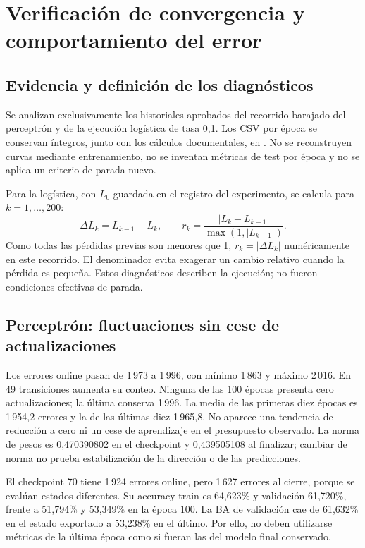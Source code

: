 \barrerapagina
\section{Verificación de convergencia y comportamiento del error}\label{sec:convergencia}
\subsection{Evidencia y definición de los diagnósticos}
Se analizan exclusivamente los historiales aprobados del recorrido barajado del perceptrón y de la ejecución logística de tasa 0,1. Los CSV por época se conservan íntegros, junto con los cálculos documentales, en . No se reconstruyen curvas mediante entrenamiento, no se inventan métricas de test por época y no se aplica un criterio de parada nuevo.

Para la logística, con $L_0$ guardada en el registro del experimento, se calcula para $k=1,\dots,200$:
\begin{equation}\Delta L_k=L_{k-1}-L_k,\qquad r_k=\frac{|L_k-L_{k-1}|}{\max(1,|L_{k-1}|)}.\label{eq:diagnosticos}\end{equation}
Como todas las pérdidas previas son menores que 1, $r_k=|\Delta L_k|$ numéricamente en este recorrido. El denominador evita exagerar un cambio relativo cuando la pérdida es pequeña. Estos diagnósticos describen la ejecución; no fueron condiciones efectivas de parada.

\subsection{Perceptrón: fluctuaciones sin cese de actualizaciones}

Los errores online pasan de 1\,973 a 1\,996, con mínimo 1\,863 y máximo 2\,016. En 49 transiciones aumenta su conteo. Ninguna de las 100 épocas presenta cero actualizaciones; la última conserva 1\,996. La media de las primeras diez épocas es 1\,954,2 errores y la de las últimas diez 1\,965,8. No aparece una tendencia de reducción a cero ni un cese de aprendizaje en el presupuesto observado. La norma de pesos es 0,470390802 en el checkpoint y 0,439505108 al finalizar; cambiar de norma no prueba estabilización de la dirección o de las predicciones.

El checkpoint 70 tiene 1\,924 errores online, pero 1\,627 errores al cierre, porque se evalúan estados diferentes. Su accuracy train es 64,623\% y validación 61,720\%, frente a 51,794\% y 53,349\% en la época 100. La BA de validación cae de 61,632\% en el estado exportado a 53,238\% en el último. Por ello, no deben utilizarse métricas de la última época como si fueran las del modelo final conservado.

